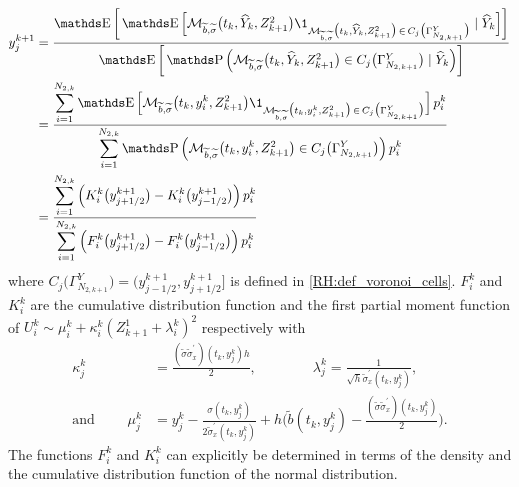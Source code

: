 \begin{equation}
	\begin{aligned}
		y_j^{k+1}
		 & = \frac{ \E \bigg[ \E \Big[ \mathcal{M}_{\widetilde b, \widetilde \sigma} \big( t_k, \widehat Y_k, Z_{k+1}^2 \big) \1_{ \mathcal{M}_{\widetilde b, \widetilde \sigma} \big( t_k, \widehat Y_k, Z_{k+1}^2 \big) \, \in \, C_j \big( \Gamma_{N_{2,k+1}}^Y \big) } \mid \widehat Y_k \Big] \bigg] }{ \E \bigg[ \Prob \Big( \mathcal{M}_{\widetilde b, \widetilde \sigma} \big( t_k, \widehat Y_k, Z_{k+1}^2 \big) \in C_j \big( \Gamma_{N_{2,k+1}}^Y \big) \mid \widehat Y_k \Big) \bigg] } \\
		 & = \frac{ \displaystyle \sum_{i=1}^{N_{2,k}} \E \Big[ \mathcal{M}_{\widetilde b, \widetilde \sigma} \big( t_k, y_i^k, Z_{k+1}^2 \big) \1_{ \mathcal{M}_{\widetilde b, \widetilde \sigma} \big( t_k, y_i^k, Z_{k+1}^2 \big) \, \in \, C_j \big( \Gamma_{N_{2,k+1}}^Y \big) } \Big] \, p_i^k}{ \displaystyle \sum_{i=1}^{N_{2,k}} \Prob \Big( \mathcal{M}_{\widetilde b, \widetilde \sigma} \big( t_k, y_i^k, Z_{k+1}^2 \big) \in C_j \big( \Gamma_{N_{2,k+1}}^Y \big) \Big) \, p_i^k}      \\
		 & = \frac{ \displaystyle \sum_{i=1}^{N_{2,k}} \Big( K_i^k \big( y_{j + 1/2}^{k+1} \big) - K_i^k \big( y_{j - 1/2}^{k+1} \big) \Big) \, p_i^k}{ \displaystyle \sum_{i=1}^{N_{2,k}} \Big( F_i^k \big( y_{j + 1/2}^{k+1} \big) - F_i^k \big( y_{j - 1/2}^{k+1} \big) \Big) \, p_i^k }                                                                                                                                                                                                         \\
	\end{aligned}
\end{equation}
where $C_j \big( \Gamma_{N_{2,k+1}}^Y \big) = \big( y_{j - 1/2}^{k+1}, y_{j + 1/2}^{k+1} \big]$ is defined in \eqref{RH:def_voronoi_cells}. $F_i^k$ and $K_i^k$ are the cumulative distribution function and the first partial moment function of $U_i^k \sim \mu_i^k + \kappa_i^k ( Z_{k+1}^1 + \lambda_i^k )^2$ respectively with
\begin{equation} \label{RH:mean_std_milstein}
	\begin{aligned}
		\kappa_j^k                   & = \frac{(\widetilde \sigma \widetilde \sigma_{x}^{\prime}) (t_k,y_j^k) h}{2}, \qquad \qquad \lambda_j^k = \frac{1}{\sqrt{h} \widetilde \sigma_{x}^{\prime} (t_k,y_j^k)},                                   \\
		\textrm{and } \qquad \mu_j^k & = y_j^k - \frac{\sigma(t_k,y_j^k)}{2 \widetilde \sigma_{x}^{\prime} ( t_k, y_j^k )} + h \bigg( \widetilde b(t_k, y_j^k) - \frac{(\widetilde \sigma \widetilde \sigma_{x}^{\prime}) (t_k,y_j^k)}{2} \bigg).
	\end{aligned}
\end{equation}
The functions $F_i^k$ and $K_i^k$ can explicitly be determined in terms of the density and the cumulative distribution function of the normal distribution.

